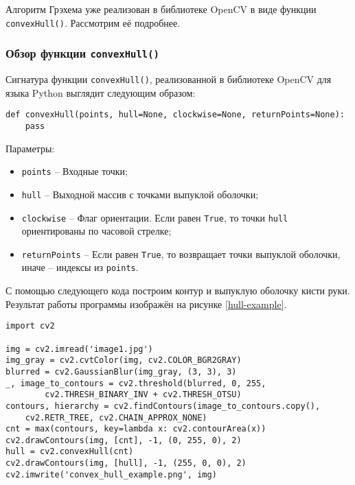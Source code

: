 Алгоритм Грэхема уже реализован в библиотеке OpenCV в виде функции
{\tt convexHull()}. Рассмотрим её подробнее.

\subsubsection{Обзор функции {\tt convexHull()}}

Сигнатура функции {\tt convexHull()}, реализованной в библиотеке OpenCV 
для языка Python выглядит следующим образом:
\begin{verbatim}
def convexHull(points, hull=None, clockwise=None, returnPoints=None):
	pass
\end{verbatim}

Параметры:
\begin{itemize}
	\item {\tt points} -- Входные точки;
	\item {\tt hull} -- Выходной массив с точками выпуклой оболочки;
	\item {\tt clockwise} -- Флаг ориентации. Если равен {\tt True},
то точки {\tt hull} ориентированы по часовой стрелке;
	\item {\tt returnPoints} -- Если равен {\tt True}, то возвращает 
точки выпуклой оболочки, иначе -- индексы из {\tt points}.
\end{itemize}

С помощью следующего кода построим контур и выпуклую оболочку
кисти руки. Результат работы программы изображён на рисунке 
\ref{hull-example}.
\begin{verbatim}
import cv2

img = cv2.imread('image1.jpg')
img_gray = cv2.cvtColor(img, cv2.COLOR_BGR2GRAY)
blurred = cv2.GaussianBlur(img_gray, (3, 3), 3)
_, image_to_contours = cv2.threshold(blurred, 0, 255,
        cv2.THRESH_BINARY_INV + cv2.THRESH_OTSU)
contours, hierarchy = cv2.findContours(image_to_contours.copy(),
	cv2.RETR_TREE, cv2.CHAIN_APPROX_NONE)
cnt = max(contours, key=lambda x: cv2.contourArea(x))
cv2.drawContours(img, [cnt], -1, (0, 255, 0), 2)
hull = cv2.convexHull(cnt)
cv2.drawContours(img, [hull], -1, (255, 0, 0), 2)
cv2.imwrite('convex_hull_example.png', img)
\end{verbatim}


